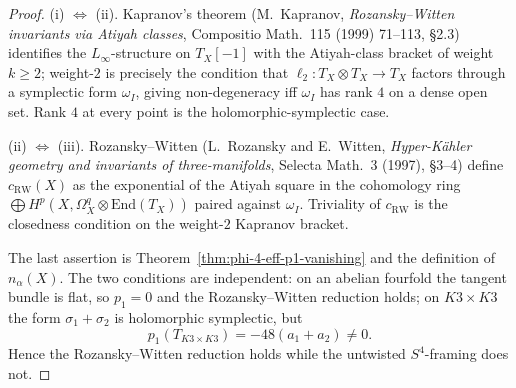 \begin{proof}
\textup{(i)} \(\Leftrightarrow\) \textup{(ii)}. Kapranov's theorem
\textup{(}M.\ Kapranov, \emph{Rozansky--Witten invariants via Atiyah
classes}, Compositio Math.~115 \textup{(}1999\textup{)} 71--113,
\S 2.3\textup{)} identifies the $L_\infty$-structure on $T_X[-1]$ with
the Atiyah-class bracket of weight $k \geq 2$; weight-$2$ is precisely
the condition that $\ell_2 : T_X \otimes T_X \to T_X$ factors through
	a symplectic form \(\omega_I\), giving non-degeneracy iff \(\omega_I\)
	has rank \(4\) on a dense open set. Rank \(4\) at every point is the
	holomorphic-symplectic case.

\textup{(ii)} \(\Leftrightarrow\) \textup{(iii)}. Rozansky--Witten \textup{(}L.\ Rozansky
and E.\ Witten, \emph{Hyper-K\"ahler geometry and invariants of
three-manifolds}, Selecta Math.~3 \textup{(}1997\textup{),}
\S 3--4\textup{)} define $c_{\mathrm{RW}}(X)$ as the exponential of
the Atiyah square in the cohomology ring
$\bigoplus H^p(X, \Omega^q_X \otimes \mathrm{End}(T_X))$ paired against
$\omega_I$. Triviality of $c_{\mathrm{RW}}$ is the closedness condition
on the weight-$2$ Kapranov bracket.

The last assertion is Theorem~\ref{thm:phi-4-eff-p1-vanishing} and the
definition of \(n_\alpha(X)\). The two conditions are independent:
on an abelian fourfold the tangent bundle is flat, so \(p_1=0\) and the
Rozansky--Witten reduction holds; on \(K3\times K3\) the form
\(\sigma_1+\sigma_2\) is holomorphic symplectic, but
\[
p_1(T_{K3\times K3})=-48(a_1+a_2)\neq0.
\]
Hence the Rozansky--Witten reduction holds while the untwisted
\(S^4\)-framing does not.
\end{proof}

